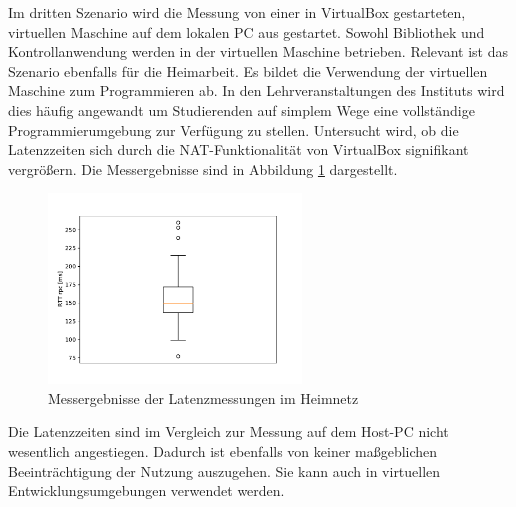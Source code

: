 \documentclass[11pt,a4paper]{report}
\begin{document}
Im dritten Szenario wird die Messung von einer in VirtualBox gestarteten, virtuellen Maschine auf dem lokalen PC aus gestartet.
Sowohl Bibliothek und Kontrollanwendung werden in der virtuellen Maschine betrieben.
Relevant ist das Szenario ebenfalls für die Heimarbeit.
Es bildet die Verwendung der virtuellen Maschine zum Programmieren ab.
In den Lehrveranstaltungen des Instituts wird dies häufig angewandt um Studierenden auf simplem Wege eine vollständige Programmierumgebung zur Verfügung zu stellen. 
Untersucht wird, ob die Latenzzeiten sich durch die NAT-Funktionalität von VirtualBox signifikant vergrößern.
Die Messergebnisse sind in Abbildung \ref{fig:measure_vm} dargestellt.
\begin{figure}[htbp]
  \centering
  \includegraphics[width=0.6\textwidth]{images/timing_vm}
  \caption{Messergebnisse der Latenzmessungen im Heimnetz}
  \label{fig:measure_vm}
\end{figure}
Die Latenzzeiten sind im Vergleich zur Messung auf dem Host-PC nicht wesentlich angestiegen.
Dadurch ist ebenfalls von keiner maßgeblichen Beeinträchtigung der Nutzung auszugehen.
Sie kann auch in virtuellen Entwicklungsumgebungen verwendet werden.
\end{document}
